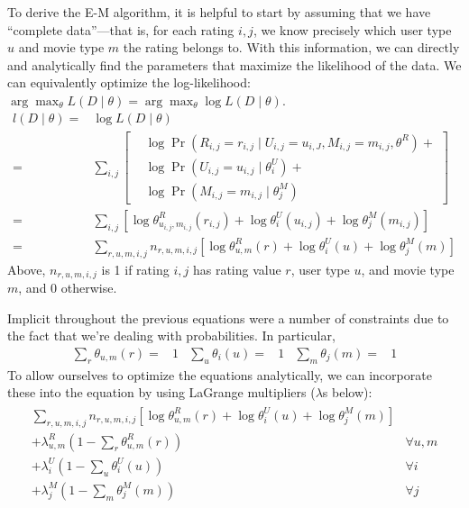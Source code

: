 \documentclass{article}
\newcommand{\LL}   [2]{{ L \left( #1 \mid #2 \right) }}
\newcommand{\LLL}  [2]{{ l \left( #1 \mid #2 \right) }}
\newcommand{\PO}   [1]{{ \Pr \left( #1 \right) }}
\newcommand{\PP}   [2]{{ \PO{ #1 \mid #2 } }}
\begin{document}
To derive the E-M algorithm, it is helpful to start by assuming that
we have ``complete data''---that is, for each rating $i,j$, we know
precisely which user type $u$ and movie type $m$ the rating belongs
to.  With this information, we can directly and analytically find the
parameters that maximize the likelihood of the data.  We can
equivalently optimize the log-likelihood: $\arg \max_\theta
\LL{D}{\theta} = \arg \max_\theta \log \LL{D}{\theta}$.
\begin{align}
  \LLL{D}{\theta} =& \log \LL{D}{\theta} \\
  =& \sum_{i,j} \left[
    \begin{aligned}
      & \log \PP{R_{i,j} = r_{i,j}}{U_{i,j} = u_{i,J}, M_{i,j} = m_{i,j},
        \theta^R} + \\
      & \log \PP{U_{i,j} = u_{i,j}}{\theta^U_i} + \\
      & \log \PP{M_{i,j} = m_{i,j}}{\theta^M_j}
    \end{aligned}
  \right] \\
  =& \sum_{i,j} \left[
    \log \theta^R_{u_{i,j},m_{i,j}}(r_{i,j}) +
    \log \theta^U_i(u_{i,j}) +
    \log \theta^M_j(m_{i,j})
  \right] \\
  =& \sum_{r,u,m,i,j} n_{r,u,m,i,j} \left[
    \log \theta^R_{u,m}(r) + \log \theta^U_i(u) + \log \theta^M_j(m)
  \right]
\end{align}
Above, $n_{r,u,m,i,j}$ is 1 if rating $i,j$ has rating value $r$, user
type $u$, and movie type $m$, and 0 otherwise.

Implicit throughout the previous equations were a number of
constraints due to the fact that we're dealing with probabilities. In
particular,
\begin{align}
\sum_r \theta_{u,m}(r) =& 1 &
\sum_u \theta_i(u) =& 1 &
\sum_m \theta_j(m) =& 1
\end{align}
To allow ourselves to optimize the equations analytically, we can
incorporate these into the equation by using LaGrange multipliers
($\lambda$s below):
\begin{align}
  \begin{aligned}
    \sum_{r,u,m,i,j} n_{r,u,m,i,j} \left[
      \log \theta^R_{u,m}(r) + \log \theta^U_i(u) + \log \theta^M_j(m)
    \right] & \\
    \mathbin{+} \lambda^R_{u,m} \left( 1 - \sum_r \theta^R_{u,m}(r) \right)
    & \forall u,m \\
    \mathbin{+} \lambda^U_i \left( 1 - \sum_u \theta^U_i(u) \right)
    & \forall i \\
    \mathbin{+} \lambda^M_j \left( 1 - \sum_m \theta^M_j(m) \right)
    & \forall j
  \end{aligned}
\end{align}
\end{document}
